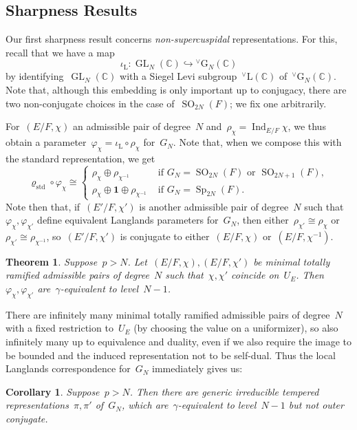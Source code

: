 \documentclass[12pt]{amsart}
\newcommand{\BC}{\mathbb {C}}
\newcommand{\GL}{\operatorname{GL}}
\newcommand{\Ind}{\operatorname{Ind}}
\newcommand{\SO}{\operatorname{SO}}
\newcommand{\G}{\mathrm{G}}
\newcommand{\Sp}{\operatorname{Sp}}
\def\boI{\boldsymbol 1}
\def\L{\mathrm{L}}
\def\rhostd{\varrho_{\mathrm{std}}} %
\def\vG{{}^\vee\G}
\def\vL{{}^\vee\L}
\newtheorem{thm}{Theorem}[section]
\newtheorem{cor}[thm]{Corollary}
\newtheorem{thm}[equation]{Theorem}
\newtheorem{cor}[equation]{Corollary}
\begin{document}
\subsection{Sharpness Results}\label{sub:sharp}

Our first sharpness result concerns \emph{non-supercuspidal} representations. For this, recall that we have a map
\[
\iota_{\L}: \GL_{N}(\BC) \hookrightarrow \vG_N(\BC)
\]
by identifying~$\GL_N(\BC)$ with a Siegel Levi subgroup~$\vL(\BC)$ of~$\vG_N(\BC)$. Note that, although this embedding is only important up to conjugacy, there are two non-conjugate choices in the case of~$\SO_{2N}(F)$; we fix one arbitrarily. 

For~$(E/F,\chi)$ an admissible pair of degree~$N$ and~$\rho_\chi=\Ind_{E/F} \chi$, we thus obtain a parameter~$\varphi_\chi=\iota_\L\circ\rho_\chi$ for~$G_N$.  Note that, when we compose this with the standard representation, we get
\[
\rhostd\circ\varphi_\chi \cong \begin{cases} 
\rho_\chi\oplus\rho_{\chi^{-1}} &\text{ if }G_N=\SO_{2N}(F)\text{ or }\SO_{2N+1}(F), \\
\rho_\chi\oplus\boI\oplus \rho_{\chi^{-1}} &\text{ if }G_N=\Sp_{2N}(F). \end{cases}
\]
Note then that, if~$(E'/F,\chi')$ is another admissible pair of degree~$N$ such that~$\varphi_\chi,\varphi_{\chi'}$ define equivalent Langlands parameters for~$G_N$, then either~$\rho_{\chi'}\cong\rho_\chi$ or~$\rho_{\chi'}\cong\rho_{\chi^{-1}}$, so~$(E'/F,\chi')$ is conjugate to either~$(E/F,\chi)$ or~$(E/F,\chi^{-1})$.

\begin{thm}\label{thm:noncusp}
Suppose~$p>N$. Let~$(E/F,\chi),(E/F,\chi')$ be minimal totally ramified admissible pairs of degree~$N$ such that~$\chi,\chi'$ coincide on~$U_E$. Then~$\varphi_\chi,\varphi_{\chi'}$ are~$\gamma$-equivalent to level~$N-1$.
\end{thm}

There are infinitely many minimal totally ramified admissible pairs of degree~$N$ with a fixed restriction to~$U_E$ (by choosing the value on a uniformizer), so also infinitely many up to equivalence and duality, even if we also require the image to be bounded and the induced representation not to be self-dual. Thus the local Langlands correspondence for~$G_N$ immediately gives us:

\begin{cor}\label{cor:noncusp}
Suppose~$p>N$. Then there are generic irreducible tempered representations~$\pi,\pi'$ of~$G_N$, which are~$\gamma$-equivalent to level~$N-1$ but not outer conjugate.
\end{cor}
\end{document}
